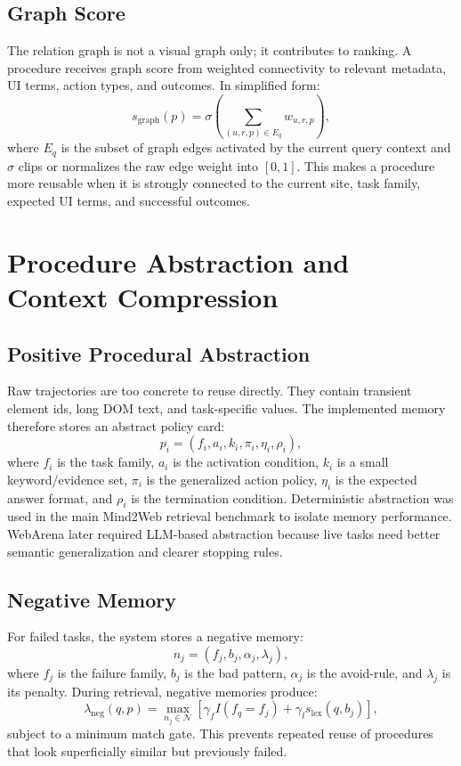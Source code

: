 \documentclass[11pt]{article}
\begin{document}
\subsection{Graph Score}

The relation graph is not a visual graph only; it contributes to ranking. A procedure receives graph score from weighted connectivity to relevant metadata, UI terms, action types, and outcomes. In simplified form:
\begin{equation}
  s_{\mathrm{graph}}(p)=\sigma\left(\sum_{(u,r,p)\in E_q} w_{u,r,p}\right),
\end{equation}
where $E_q$ is the subset of graph edges activated by the current query context and $\sigma$ clips or normalizes the raw edge weight into $[0,1]$. This makes a procedure more reusable when it is strongly connected to the current site, task family, expected UI terms, and successful outcomes.

\section{Procedure Abstraction and Context Compression}

\subsection{Positive Procedural Abstraction}

Raw trajectories are too concrete to reuse directly. They contain transient element ids, long DOM text, and task-specific values. The implemented memory therefore stores an abstract policy card:
\begin{equation}
  p_i = \left(f_i, a_i, k_i, \pi_i, \eta_i, \rho_i\right),
\end{equation}
where $f_i$ is the task family, $a_i$ is the activation condition, $k_i$ is a small keyword/evidence set, $\pi_i$ is the generalized action policy, $\eta_i$ is the expected answer format, and $\rho_i$ is the termination condition. Deterministic abstraction was used in the main Mind2Web retrieval benchmark to isolate memory performance. WebArena later required LLM-based abstraction because live tasks need better semantic generalization and clearer stopping rules.

\subsection{Negative Memory}

For failed tasks, the system stores a negative memory:
\begin{equation}
  n_j = \left(f_j, b_j, \alpha_j, \lambda_j\right),
\end{equation}
where $f_j$ is the failure family, $b_j$ is the bad pattern, $\alpha_j$ is the avoid-rule, and $\lambda_j$ is its penalty. During retrieval, negative memories produce:
\begin{equation}
  \lambda_{\mathrm{neg}}(q,p)=\max_{n_j \in \mathcal{N}} \left[\gamma_f I(f_q=f_j)+\gamma_l s_{\mathrm{lex}}(q,b_j)\right],
\end{equation}
subject to a minimum match gate. This prevents repeated reuse of procedures that look superficially similar but previously failed.
\end{document}
